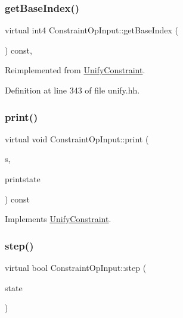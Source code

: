 \subsubsection{\texorpdfstring{getBaseIndex()}{getBaseIndex()}}
{\footnotesize\ttfamily virtual int4 Constraint\+Op\+Input\+::get\+Base\+Index (\begin{DoxyParamCaption}\item[{void}]{ }\end{DoxyParamCaption}) const\hspace{0.3cm}{\ttfamily [inline]}, {\ttfamily [virtual]}}



Reimplemented from \mbox{\hyperlink{class_unify_constraint_a44f0164f38ac1fdc44fc73ebe7678de1}{Unify\+Constraint}}.



Definition at line 343 of file unify.\+hh.

\mbox{\label{class_constraint_op_input_af29ea53a74e235c88e2aacea3e49b185}} 
\subsubsection{\texorpdfstring{print()}{print()}}
{\footnotesize\ttfamily virtual void Constraint\+Op\+Input\+::print (\begin{DoxyParamCaption}\item[{ostream \&}]{s,  }\item[{\mbox{\hyperlink{class_unify_c_printer}{Unify\+C\+Printer}} \&}]{printstate }\end{DoxyParamCaption}) const\hspace{0.3cm}{\ttfamily [virtual]}}



Implements \mbox{\hyperlink{class_unify_constraint_a774f6a611a96384766cb8e8d8f5ff41f}{Unify\+Constraint}}.

\mbox{\label{class_constraint_op_input_ad3db5bd9dd80ffb0492f0ffd11acd19c}} 
\subsubsection{\texorpdfstring{step()}{step()}}
{\footnotesize\ttfamily virtual bool Constraint\+Op\+Input\+::step (\begin{DoxyParamCaption}\item[{\mbox{\hyperlink{class_unify_state}{Unify\+State}} \&}]{state }\end{DoxyParamCaption})\hspace{0.3cm}{\ttfamily [virtual]}}




